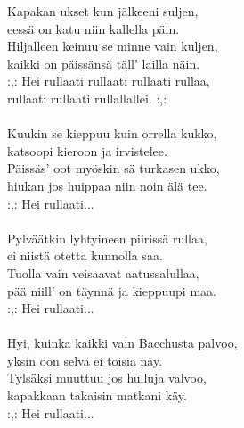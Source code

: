
            Kapakan ukset kun jälkeeni suljen, \\
            eessä on katu niin kallella päin. \\
            Hiljalleen keinuu se minne vain kuljen, \\
            kaikki on päissänsä täll’ lailla näin. \\
            :,: Hei rullaati rullaati rullaati rullaa, \\
            rullaati rullaati rullallallei. :,: \\
\hspace{10mm} \\
            Kuukin se kieppuu kuin orrella kukko, \\
            katsoopi kieroon ja irvistelee. \\
            Päissäs’ oot myöskin sä turkasen ukko, \\
            hiukan jos huippaa niin noin älä tee. \\
            :,: Hei rullaati... \\
\hspace{10mm} \\
            Pylväätkin lyhtyineen piirissä rullaa, \\
            ei niistä otetta kunnolla saa. \\
            Tuolla vain veisaavat aatussalullaa, \\
            pää niill’ on täynnä ja kieppuupi maa. \\
            :,: Hei rullaati... \\
\hspace{10mm} \\
            Hyi, kuinka kaikki vain Bacchusta palvoo, \\
            yksin oon selvä ei toisia näy. \\
            Tylsäksi muuttuu jos hulluja valvoo, \\
            kapakkaan takaisin matkani käy. \\
            :,: Hei rullaati... \\

